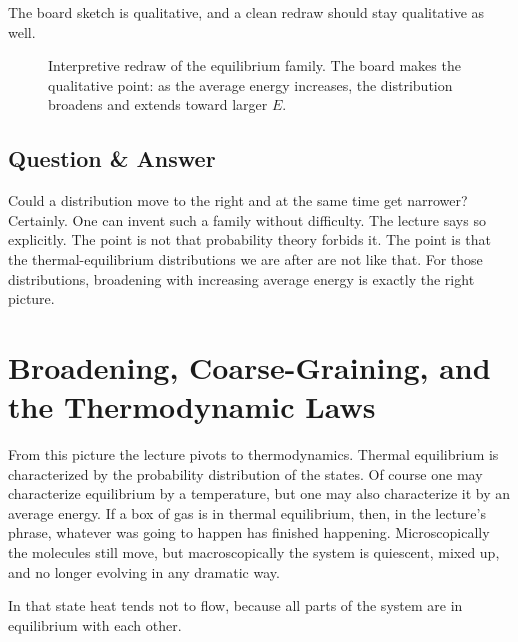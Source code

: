 The board sketch is qualitative, and a clean redraw should stay qualitative as well.

\begin{figure}[htbp]
\centering
{}
\caption{Interpretive redraw of the equilibrium family. The board makes the qualitative point: as the average energy increases, the distribution broadens and extends toward larger \(E\).}
\end{figure}

\subsection{Question \& Answer}

Could a distribution move to the right and at the same time get narrower? Certainly. One can invent such a family without difficulty. The lecture says so explicitly. The point is not that probability theory forbids it. The point is that the thermal-equilibrium distributions we are after are not like that. For those distributions, broadening with increasing average energy is exactly the right picture.

\section{Broadening, Coarse-Graining, and the Thermodynamic Laws}

From this picture the lecture pivots to thermodynamics. Thermal equilibrium is characterized by the probability distribution of the states. Of course one may characterize equilibrium by a temperature, but one may also characterize it by an average energy. If a box of gas is in thermal equilibrium, then, in the lecture's phrase, whatever was going to happen has finished happening. Microscopically the molecules still move, but macroscopically the system is quiescent, mixed up, and no longer evolving in any dramatic way.

In that state heat tends not to flow, because all parts of the system are in equilibrium with each other.

